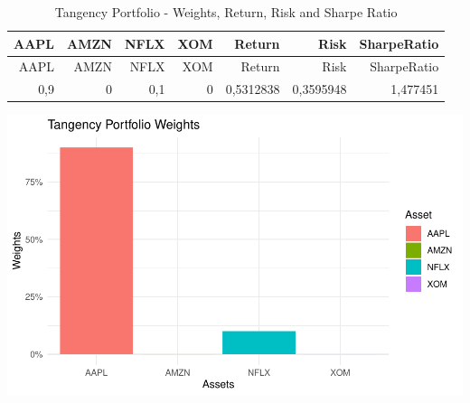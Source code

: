 \documentclass[
]{article}
\begin{document}
\begin{longtable}[]{@{}rrrrrrr@{}}
\caption{Tangency Portfolio - Weights, Return, Risk and Sharpe
Ratio}\tabularnewline
\toprule()
AAPL & AMZN & NFLX & XOM & Return & Risk & SharpeRatio \\
\midrule()
\endfirsthead
\toprule()
AAPL & AMZN & NFLX & XOM & Return & Risk & SharpeRatio \\
\midrule()
\endhead
0,9 & 0 & 0,1 & 0 & 0,5312838 & 0,3595948 & 1,477451 \\
\bottomrule()
\end{longtable}

\begin{center}\includegraphics{EfficientFrontier_files/figure-latex/plot Tangency Portfolio-1} \end{center}
\end{document}
